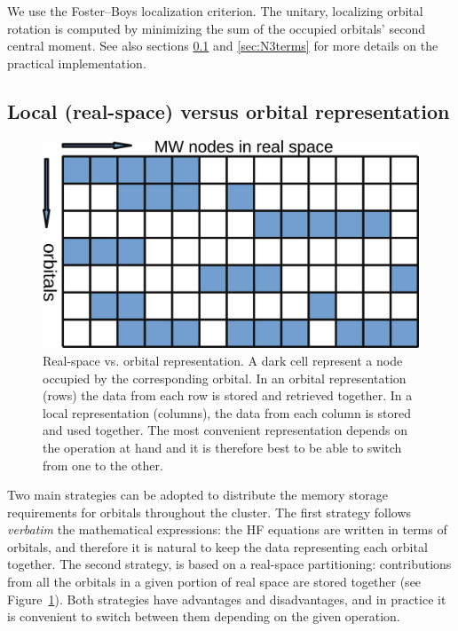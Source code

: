 \documentclass[journal=jctcce, manuscript=article]{achemso}
\begin{document}
We use the Foster--Boys localization criterion.\cite{Foster1960} The unitary, localizing orbital rotation is computed by minimizing the sum of the occupied orbitals' second central moment.\cite{Hoyvik2016-cw} See also sections \ref{sec:localvsorb} and \ref{sec:N3terms} for more details on the practical implementation.

\subsection{Local (real-space) versus orbital representation}
\label{sec:localvsorb}

\begin{figure}
\centering
\includegraphics[width=1.\textwidth]{checkerboard.png}
\caption{\label{fig01} Real-space vs. orbital representation. A dark cell represent a node occupied by the corresponding orbital. In an orbital representation (rows) the data from each row is stored and retrieved together. In a local representation (columns), the data from each column is stored and used together. The most convenient representation depends on the operation at hand and it is therefore best to be able to switch from one to the other.}
\end{figure}


Two main strategies can be adopted to distribute the memory storage requirements for orbitals throughout the cluster. The first strategy follows \emph{verbatim} the mathematical expressions: the \ac{HF} equations are written in terms of orbitals, and therefore it is natural to keep the data representing each orbital together. The second strategy, is based on a real-space partitioning: contributions from all the orbitals in a given portion of real space are stored together (see Figure~\ref{fig01}). Both strategies have advantages and disadvantages, and in practice it is convenient to switch between them depending on the given operation.
\end{document}
